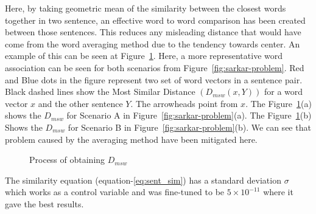 Here, by taking geometric mean of the similarity between the closest words together in two sentence,
an effective word to word comparison has been created between those sentences.
This reduces any misleading distance that would have come from the word averaging method due to
the tendency towards center.
An example of this can be seen at Figure~\ref{fig:msd}.
Here, a more representative word association can be seen for both scenarios from Figure~\ref{fig:sarkar-problem}.
Red and Blue dots in the figure represent two set of word vectors in a sentence pair.
Black dashed lines show the Most Similar Distance $(D_{msw}(x,Y))$ for a word vector $x$ and the other sentence $Y$.
The arrowheads point from $x$.
The Figure~\ref{fig:msd}(a) shows the $D_{msw}$ for Scenario A in Figure~\ref{fig:sarkar-problem}(a).
The Figure~\ref{fig:msd}(b) Shows the $D_{msw}$ for Scenario B in Figure~\ref{fig:sarkar-problem}(b).
We can see that problem caused by the averaging method have been mitigated here.\\

\begin{figure}
    \centering
    
    \caption{Process of obtaining $D_{msw}$}
    \label{fig:msd}
\end{figure}

The similarity equation (equation-\ref{eq:sent_sim}) has a standard deviation $\sigma$ which works
as a control variable and was fine-tuned to be $5 \times 10^{-11}$ where it gave the best results.

